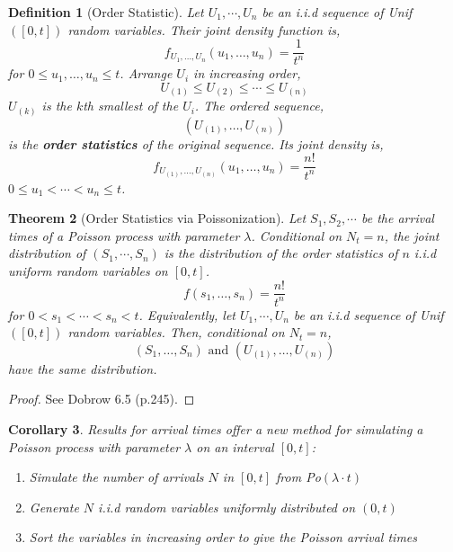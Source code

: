\documentclass{tufte-handout}
\newtheorem{thm}{Theorem}
\newtheorem{cor}[thm]{Corollary}
\newtheorem{defn}[thm]{Definition}
\begin{document}
\begin{defn}[Order Statistic]
  Let $U_1, \cdots, U_n$ be an i.i.d sequence of Unif$([0,t])$ random variables. Their joint density function is,
  \[f_{U_{1}, \ldots, U_{n}}\left(u_{1}, \ldots, u_{n}\right)=\frac{1}{t^{n}}\]
  \noindent for $0 \leq u_{1}, \ldots, u_{n} \leq t$. Arrange $U_i$ in increasing order,
  \[U_{(1)} \leq U_{(2)} \leq \cdots \leq U_{(n)}\]
  \noindent $U_(k)$ is the $k$th smallest of the $U_i$. The ordered sequence,
  \[\left(U_{(1)}, \ldots, U_{(n)}\right)\]
  \noindent is the \textbf{order statistics} of the original sequence. Its joint density is,
  \[f_{U_{(1)}, \ldots, U_{(n)}}\left(u_{1}, \ldots, u_{n}\right)=\frac{n !}{t^{n}}\]
  \noindent $0 \leq u_{1}<\cdots<u_{n} \leq t$.
\end{defn}

\begin{thm}[Order Statistics via Poissonization]
  Let $S_1, S_2, \cdots$ be the arrival times of a Poisson process with parameter $\lambda$. Conditional on $N_t = n$, the joint distribution of $(S_1, \cdots, S_n)$ is the distribution of the order statistics of $n$ i.i.d uniform random variables on $[0,t]$.
  \[f\left(s_{1}, \ldots, s_{n}\right)=\frac{n !}{t^{n}}\]
  \noindent for $0<s_{1}<\cdots<s_{n}<t$. Equivalently, let $U_1, \cdots, U_n$ be an i.i.d sequence of Unif$([0,t])$ random variables. Then, conditional on $N_t = n$, 
  \[\left(S_{1}, \ldots, S_{n}\right) \text { and } \left(U_{(1)}, \ldots, U_{(n)}\right)\]
  \noindent have the same distribution.
\end{thm}

\begin{proof}
  See Dobrow 6.5 (p.245).
\end{proof}

\begin{cor}
  Results for arrival times offer a new method for simulating a Poisson process with parameter $\lambda$ on an interval $[0, t]$:
  \begin{enumerate}
    \item Simulate the number of arrivals $N$ in $[0,t]$ from Po$(\lambda \cdot t)$
    \item Generate $N$ i.i.d random variables uniformly distributed on $(0,t)$
    \item Sort the variables in increasing order to give the Poisson arrival times
  \end{enumerate}
\end{cor}
\end{document}
